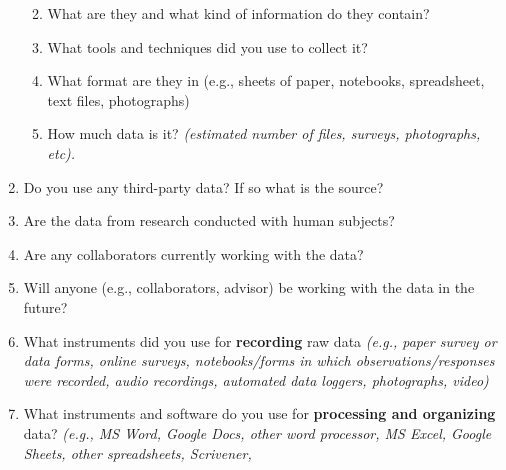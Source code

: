 \documentclass[
]{article}
\providecommand{\tightlist}{%
  \setlength{\itemsep}{0pt}\setlength{\parskip}{0pt}}
\begin{document}
\begin{enumerate}
  \begin{enumerate}
  \def\labelenumii{\alph{enumii}.}
  \tightlist
  \item
    What are they and what kind of information do they contain?\\
  \item
    What tools and techniques did you use to collect it?\\
  \item
    What format are they in (e.g., sheets of paper, notebooks,
    spreadsheet, text files, photographs)\\
  \item
    How much data is it? \emph{(estimated number of files, surveys,
    photographs, etc).}\\
    \newline   \newline  
  \end{enumerate}
\item
  Do you use any third-party data? If so what is the source?\\
  \newline \newline
\item
  Are the data from research conducted with human subjects?\\
  \newline \newline
\item
  Are any collaborators currently working with the data?\\
  \newline \newline
\item
  Will anyone (e.g., collaborators, advisor) be working with the data in
  the future?\\
  \newline \newline
\item
  What instruments did you use for \textbf{recording} raw data
  \emph{(e.g., paper survey or data forms, online surveys,
  notebooks/forms in which observations/responses were recorded, audio
  recordings, automated data loggers, photographs, video)}\\
  \newline \newline
\item
  What instruments and software do you use for \textbf{processing and
  organizing} data? \emph{(e.g., MS Word, Google Docs, other word
  processor, MS Excel, Google Sheets, other spreadsheets, Scrivener,
}
\end{enumerate}
\end{document}
